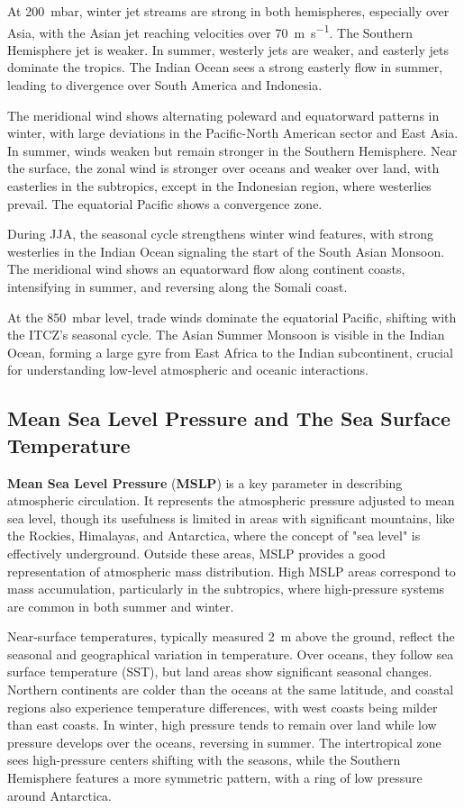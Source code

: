 At \qty{200}{\milli \bar}, winter jet streams are strong in both hemispheres, especially over Asia, with the Asian jet reaching velocities over \qty{70}{\meter\per\second}. The Southern Hemisphere jet is weaker. In summer, westerly jets are weaker, and easterly jets dominate the tropics. The Indian Ocean sees a strong easterly flow in summer, leading to divergence over South America and Indonesia.

The meridional wind shows alternating poleward and equatorward patterns in winter, with large deviations in the Pacific-North American sector and East Asia. In summer, winds weaken but remain stronger in the Southern Hemisphere. Near the surface, the zonal wind is stronger over oceans and weaker over land, with easterlies in the subtropics, except in the Indonesian region, where westerlies prevail. The equatorial Pacific shows a convergence zone.

During JJA, the seasonal cycle strengthens winter wind features, with strong westerlies in the Indian Ocean signaling the start of the South Asian Monsoon. The meridional wind shows an equatorward flow along continent coasts, intensifying in summer, and reversing along the Somali coast.

At the \qty{850}{\milli \bar} level, trade winds dominate the equatorial Pacific, shifting with the ITCZ’s seasonal cycle. The Asian Summer Monsoon is visible in the Indian Ocean, forming a large gyre from East Africa to the Indian subcontinent, crucial for understanding low-level atmospheric and oceanic interactions.

\subsection{Mean Sea Level Pressure and The Sea Surface Temperature}

\textbf{Mean Sea Level Pressure} (\textbf{MSLP}) is a key parameter in describing atmospheric circulation. It represents the atmospheric pressure adjusted to mean sea level, though its usefulness is limited in areas with significant mountains, like the Rockies, Himalayas, and Antarctica, where the concept of "sea level" is effectively underground. Outside these areas, MSLP provides a good representation of atmospheric mass distribution. High MSLP areas correspond to mass accumulation, particularly in the subtropics, where high-pressure systems are common in both summer and winter.

Near-surface temperatures, typically measured \qty{2}{\meter} above the ground, reflect the seasonal and geographical variation in temperature. Over oceans, they follow sea surface temperature (SST), but land areas show significant seasonal changes. Northern continents are colder than the oceans at the same latitude, and coastal regions also experience temperature differences, with west coasts being milder than east coasts. In winter, high pressure tends to remain over land while low pressure develops over the oceans, reversing in summer. The intertropical zone sees high-pressure centers shifting with the seasons, while the Southern Hemisphere features a more symmetric pattern, with a ring of low pressure around Antarctica.

